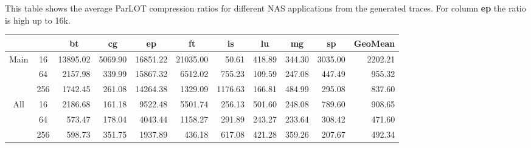 \caption{This table shows the average ParLOT compression ratios for different NAS applications from the generated traces. For column \textbf{ep} the ratio is high up to 16k. }

\begin{tabular}{ccrrrrrrrr|r|}
\hline
\multicolumn{2}{|c|}{} & \multicolumn{1}{c}{bt} & \multicolumn{1}{c}{cg} & \multicolumn{1}{c}{ep} & \multicolumn{1}{c}{ft} & \multicolumn{1}{c}{is} & \multicolumn{1}{c}{lu} & \multicolumn{1}{c}{mg} & \multicolumn{1}{c|}{sp} & \multicolumn{1}{c|}{GeoMean} \\ \hline
\multicolumn{1}{|c|}{\multirow{3}{*}{Main}} & \multicolumn{1}{c|}{16} & 13895.02 & 5069.90 & 16851.22 & 21035.00 & 50.61 & 418.89 & 344.30 & 3035.00 & 2202.21 \\
\multicolumn{1}{|c|}{} & \multicolumn{1}{c|}{64} & 2157.98 & 339.99 & 15867.32 & 6512.02 & 755.23 & 109.59 & 247.08 & 447.49 & 955.32 \\
\multicolumn{1}{|c|}{} & \multicolumn{1}{c|}{256} & 1742.45 & 261.08 & 14264.38 & 1329.09 & 1176.63 & 166.81 & 484.99 & 295.08 & 837.60 \\ \hline
\multicolumn{1}{|c|}{\multirow{3}{*}{All}} & \multicolumn{1}{c|}{16} & 2186.68 & 161.18 & 9522.48 & 5501.74 & 256.13 & 501.60 & 248.08 & 789.60 & 908.65 \\
\multicolumn{1}{|c|}{} & \multicolumn{1}{c|}{64} & 573.47 & 178.04 & 4043.44 & 1158.27 & 291.89 & 243.27 & 233.64 & 308.42 & 471.60 \\
\multicolumn{1}{|c|}{} & \multicolumn{1}{c|}{256} & 598.73 & 351.75 & 1937.89 & 436.18 & 617.08 & 421.28 & 359.26 & 207.67 & 492.34 \\ \hline 
\end{tabular}